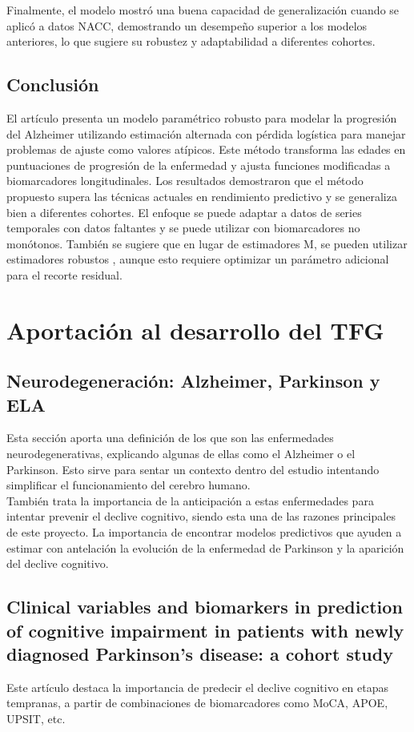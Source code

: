 Finalmente, el modelo mostró una buena capacidad de generalización cuando se aplicó a datos NACC, demostrando un desempeño superior a los modelos anteriores, lo que sugiere su robustez y adaptabilidad a diferentes cohortes.

\subsection{Conclusión}
El artículo presenta un modelo paramétrico robusto para modelar la progresión del Alzheimer utilizando estimación alternada con pérdida logística para manejar problemas de ajuste como valores atípicos. Este método transforma las edades en puntuaciones de progresión de la enfermedad y ajusta funciones modificadas a biomarcadores longitudinales. Los resultados demostraron que el método propuesto supera las técnicas actuales en rendimiento predictivo y se generaliza bien a diferentes cohortes. El enfoque se puede adaptar a datos de series temporales con datos faltantes y se puede utilizar con biomarcadores no monótonos. También se sugiere que en lugar de estimadores M, se pueden utilizar estimadores robustos \cite{rousseeuw2005robust}, aunque esto requiere optimizar un parámetro adicional para el recorte residual.

\section{Aportación al desarrollo del TFG}
\subsection{Neurodegeneración: Alzheimer, Parkinson y ELA}
Esta sección aporta una definición de los que son las enfermedades neurodegenerativas, explicando algunas de ellas como el Alzheimer o el Parkinson. Esto sirve para sentar un contexto dentro del estudio intentando simplificar el funcionamiento del cerebro humano.\\

También trata la importancia de la anticipación a estas enfermedades para intentar prevenir el declive cognitivo, siendo esta una de las razones principales de este proyecto. La importancia de encontrar modelos predictivos que ayuden a estimar con antelación la evolución de la enfermedad de Parkinson y la aparición del declive cognitivo. \\

\subsection{Clinical variables and biomarkers in prediction of cognitive impairment in patients with newly diagnosed Parkinson’s disease: a cohort study}
Este artículo destaca la importancia de predecir el declive cognitivo en etapas tempranas, a partir de combinaciones de biomarcadores como MoCA, APOE, UPSIT, etc.\\

